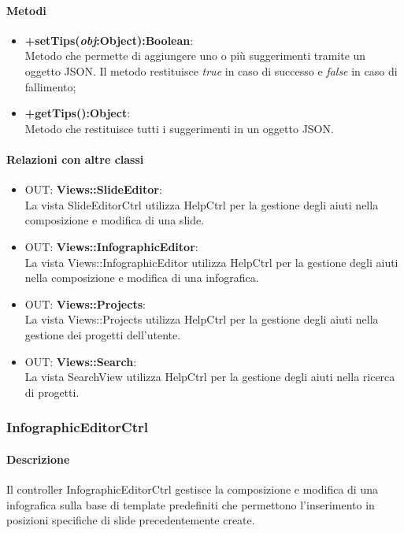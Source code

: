 	\paragraph{Metodi}
	\begin{itemize}
	  \item \textbf{+setTips(\textit{obj}:Object):Boolean}:\\
		  Metodo che permette di aggiungere uno o più suggerimenti tramite un oggetto JSON. Il metodo restituisce \textit{true} in caso di successo e \textit{false} in caso di fallimento;
	  \item \textbf{+getTips():Object}:\\
		  Metodo che restituisce tutti i suggerimenti in un oggetto JSON.
	\end{itemize}
	\paragraph{Relazioni con altre classi}
	\begin{itemize}
	 \item OUT: \textbf{Views::SlideEditor}:\\
		La vista SlideEditorCtrl utilizza HelpCtrl per la gestione degli aiuti nella composizione e modifica di una slide.
	 \item OUT: \textbf{Views::InfographicEditor}:\\
		La vista Views::InfographicEditor utilizza HelpCtrl per la gestione degli aiuti nella composizione e modifica di una infografica.
	 \item OUT: \textbf{Views::Projects}:\\
		La vista Views::Projects utilizza HelpCtrl per la gestione degli aiuti nella gestione dei progetti dell'utente.
	 \item OUT: \textbf{Views::Search}:\\
		La vista SearchView utilizza HelpCtrl per la gestione degli aiuti nella ricerca di progetti.
	\end{itemize}

\newpage
\subsubsection{InfographicEditorCtrl}
	\paragraph{Descrizione}
		Il controller InfographicEditorCtrl gestisce la composizione e modifica di una infografica sulla base di template predefiniti che permettono l'inserimento in posizioni specifiche di slide precedentemente create.
	
